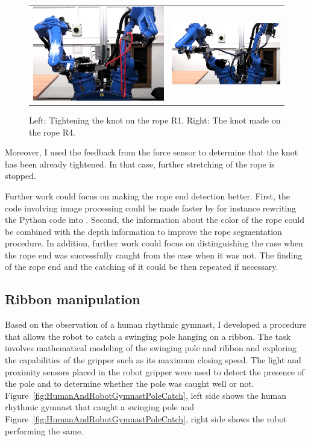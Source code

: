        \begin{figure}[h]
            \centering
            \begin{tabular}{cc}
            \includegraphics[height=0.3\textwidth]{Img/tyer/R1KnotTightening.png}
            &
            \includegraphics[height=0.3\textwidth]{Img/tyer/R4KnotTightening.png}

            \end{tabular}
            \caption{Left: Tightening the knot on the rope R1, Right: The knot made on the rope R4.}
            \label{fig:R1R4ExampleImgs}
        \end{figure}

        Moreover, I used the feedback from the force sensor to determine that the knot has been already tightened. In that case, further stretching of the rope is stopped.

        Further work could focus on making the rope end detection better. First, the code involving image processing could be made faster by for instance rewriting the Python code into \Cplusplus. Second, the information about the color of the rope could be combined with the depth information to improve the rope segmentation procedure. In addition, further work could focus on distinguishing the case when the rope end was successfully caught from the case when it was not. The finding of the rope end and the catching of it could be then repeated if necessary.

    \subsection{Ribbon manipulation}
        Based on the observation of a human rhythmic gymnast, I developed a procedure that allows the \CloPeMa\/ robot to catch a swinging pole hanging on a ribbon. The task involves mathematical modeling of the swinging pole and ribbon and exploring the capabilities of the gripper such as its maximum closing speed. The light and proximity sensors placed in the robot gripper were used to detect the presence of the pole and to determine whether the pole was caught well or not. Figure~\ref{fig:HumanAndRobotGymnastPoleCatch}, left side shows the human rhythmic gymnast that caught a swinging pole and Figure~\ref{fig:HumanAndRobotGymnastPoleCatch}, right side shows the \CloPeMa\/ robot performing the same.

